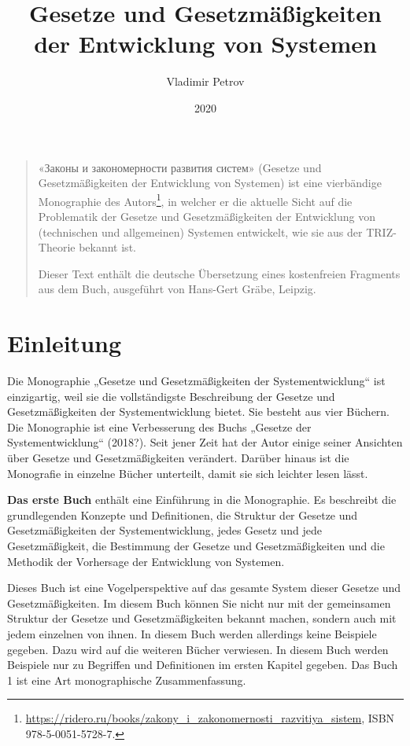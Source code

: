 \documentclass[11pt,a4paper]{article}
\title{Gesetze und Gesetzmäßigkeiten\\ der Entwicklung von Systemen}
\author{Vladimir Petrov}
\date{2020}
\begin{document}
\maketitle

\begin{quote}
  \foreignlanguage{russian}{«Законы и закономерности развития систем»}
  (Gesetze und Gesetzmäßigkeiten der Entwicklung von Systemen) ist eine
  vierbändige Monographie des
  Autors\footnote{\url{https://ridero.ru/books/zakony_i_zakonomernosti_razvitiya_sistem},
    ISBN 978-5-0051-5728-7.}, in welcher er die aktuelle Sicht auf die
  Problematik der Gesetze und Gesetzmäßig\-keiten der Entwicklung von
  (technischen und allgemeinen) Systemen entwickelt, wie sie aus der
  TRIZ-Theorie bekannt ist.

  Dieser Text enthält die deutsche Übersetzung eines kostenfreien Fragments
  aus dem Buch, ausgeführt von Hans-Gert Gräbe, Leipzig.
\end{quote}
\section*{Einleitung}

Die Monographie „Gesetze und Gesetzmäßigkeiten der Systementwicklung“ ist
einzigartig, weil sie die vollständigste Beschreibung der Gesetze und
Gesetzmäßigkeiten der Systementwicklung bietet. Sie besteht aus vier
Büchern. Die Monographie ist eine Verbesserung des Buchs „Gesetze der
Systementwicklung“ (2018?).  Seit jener Zeit hat der Autor einige seiner
Ansichten über Gesetze und Gesetzmäßigkeiten verändert. Darüber hinaus ist die
Monografie in einzelne Bücher unterteilt, damit sie sich leichter lesen lässt.

\textbf{Das erste Buch} enthält eine Einführung in die Monographie. Es
beschreibt die grundlegenden Konzepte und Definitionen, die Struktur der
Gesetze und Gesetzmäßigkeiten der Systementwicklung, jedes Gesetz und jede
Gesetzmäßigkeit, die Bestimmung der Gesetze und Gesetzmäßigkeiten und die
Methodik der Vorhersage der Entwicklung von Systemen.

Dieses Buch ist eine Vogelperspektive auf das gesamte System dieser Gesetze
und Gesetz\-mäßig\-keiten. Im diesem Buch können Sie nicht nur mit der
gemeinsamen Struktur der Gesetze und Gesetzmäßigkeiten bekannt machen, sondern
auch mit jedem einzelnen von ihnen. In diesem Buch werden allerdings keine
Beispiele gegeben. Dazu wird auf die weiteren Bücher verwiesen.  In diesem
Buch werden Beispiele nur zu Begriffen und Definitionen im ersten Kapitel
gegeben. Das Buch 1 ist eine Art monographische Zusammenfassung.
\end{document}
